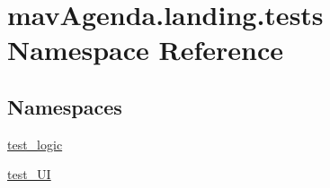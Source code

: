 \hypertarget{namespacemavAgenda_1_1landing_1_1tests}{}\section{mav\+Agenda.\+landing.\+tests Namespace Reference}
\label{namespacemavAgenda_1_1landing_1_1tests}
\subsection*{Namespaces}
\begin{DoxyCompactItemize}
\item 
 \mbox{\hyperlink{namespacemavAgenda_1_1landing_1_1tests_1_1test__logic}{test\+\_\+logic}}
\item 
 \mbox{\hyperlink{namespacemavAgenda_1_1landing_1_1tests_1_1test__UI}{test\+\_\+\+UI}}
\end{DoxyCompactItemize}

